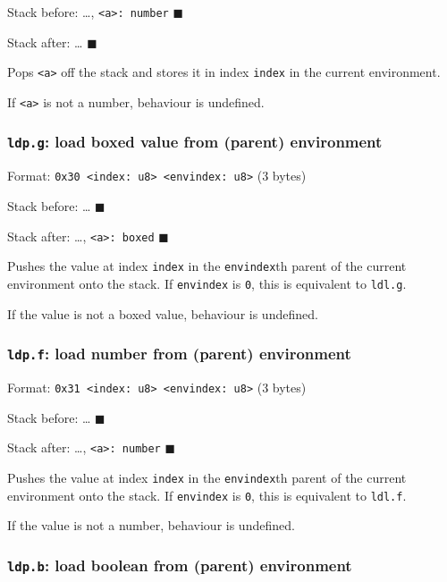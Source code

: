 Stack before: \ldots, \texttt{\textless{}a\textgreater{}:\ number}
\(\blacksquare\)

Stack after: \ldots{} \(\blacksquare\)

Pops \texttt{\textless{}a\textgreater{}} off the stack and stores it in
index \texttt{index} in the current environment.

If \texttt{\textless{}a\textgreater{}} is not a number, behaviour is
undefined.

\subsubsection{\texorpdfstring{\texttt{ldp.g}: load boxed value from
(parent)
environment}{ldp.g: load boxed value from (parent) environment}}

Format:
\texttt{0x30\ \textless{}index:\ u8\textgreater{}\ \textless{}envindex:\ u8\textgreater{}}
(3 bytes)

Stack before: \ldots{} \(\blacksquare\)

Stack after: \ldots, \texttt{\textless{}a\textgreater{}:\ boxed}
\(\blacksquare\)

Pushes the value at index \texttt{index} in the \texttt{envindex}th
parent of the current environment onto the stack. If \texttt{envindex}
is \texttt{0}, this is equivalent to \texttt{ldl.g}.

If the value is not a boxed value, behaviour is undefined.

\subsubsection{\texorpdfstring{\texttt{ldp.f}: load number from (parent)
environment}{ldp.f: load number from (parent) environment}}

Format:
\texttt{0x31\ \textless{}index:\ u8\textgreater{}\ \textless{}envindex:\ u8\textgreater{}}
(3 bytes)

Stack before: \ldots{} \(\blacksquare\)

Stack after: \ldots, \texttt{\textless{}a\textgreater{}:\ number}
\(\blacksquare\)

Pushes the value at index \texttt{index} in the \texttt{envindex}th
parent of the current environment onto the stack. If \texttt{envindex}
is \texttt{0}, this is equivalent to \texttt{ldl.f}.

If the value is not a number, behaviour is undefined.

\subsubsection{\texorpdfstring{\texttt{ldp.b}: load boolean from
(parent) environment}{ldp.b: load boolean from (parent) environment}}

